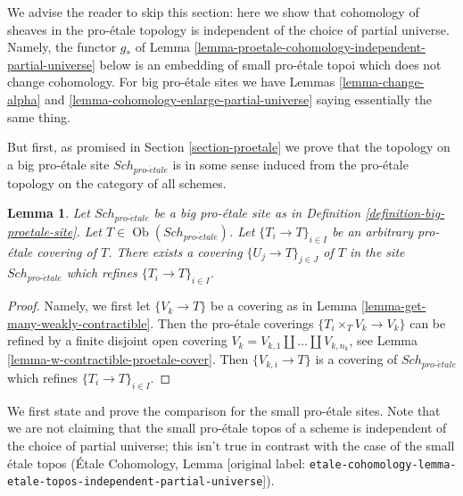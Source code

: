 \documentclass[10pt,a4paper]{article}
\theoremstyle{plain}
\newtheorem{lemma}[subsection]{Lemma}
\theoremstyle{definition}
\theoremstyle{remark}
\numberwithin{equation}{subsection}
\def\Sch{\mathit{Sch}}
\def\Ob{\mathop{\mathrm{Ob}}\nolimits}
\def\proetale{{pro\text{-}\acute{e}tale}}
\begin{document}
\noindent
We advise the reader to skip this section: here we show that cohomology
of sheaves in the pro-\'etale topology is independent of the
choice of partial universe. Namely, the functor $g_*$ of
Lemma \ref{lemma-proetale-cohomology-independent-partial-universe} below
is an embedding of small pro-\'etale topoi which does not change cohomology.
For big pro-\'etale sites we have Lemmas \ref{lemma-change-alpha} and
\ref{lemma-cohomology-enlarge-partial-universe} saying essentially the
same thing.

\medskip\noindent
But first, 
as promised in Section \ref{section-proetale} we prove that the topology on a
big pro-\'etale site $\Sch_\proetale$ is in some sense induced from
the pro-\'etale topology on the category of all schemes.

\begin{lemma}
\label{lemma-proetale-induced}
Let $\Sch_\proetale$ be a big pro-\'etale site as in
Definition \ref{definition-big-proetale-site}.
Let $T \in \Ob(\Sch_\proetale)$.
Let $\{T_i \to T\}_{i \in I}$ be an arbitrary pro-\'etale covering of $T$.
There exists a covering $\{U_j \to T\}_{j \in J}$ of $T$ in the site
$\Sch_\proetale$ which refines $\{T_i \to T\}_{i \in I}$.
\end{lemma}

\begin{proof}
Namely, we first let $\{V_k \to T\}$ be a covering as in
Lemma \ref{lemma-get-many-weakly-contractible}.
Then the pro-\'etale coverings $\{T_i \times_T V_k \to V_k\}$
can be refined by a finite disjoint open covering
$V_k = V_{k, 1} \amalg \ldots \amalg V_{k, n_k}$, see
Lemma \ref{lemma-w-contractible-proetale-cover}.
Then $\{V_{k, i} \to T\}$ is a covering of $\Sch_\proetale$
which refines $\{T_i \to T\}_{i \in I}$.
\end{proof}

\noindent
We first state and prove the comparison for the small pro-\'etale
sites. Note that we are not claiming that the small pro-\'etale topos
of a scheme is independent of the choice of partial universe; this isn't
true in contrast with the case of the small \'etale topos
(\'Etale Cohomology, Lemma
\textnormal{[original label: \nolinkurl{etale-cohomology-lemma-etale-topos-independent-partial-universe}]}).
\end{document}
